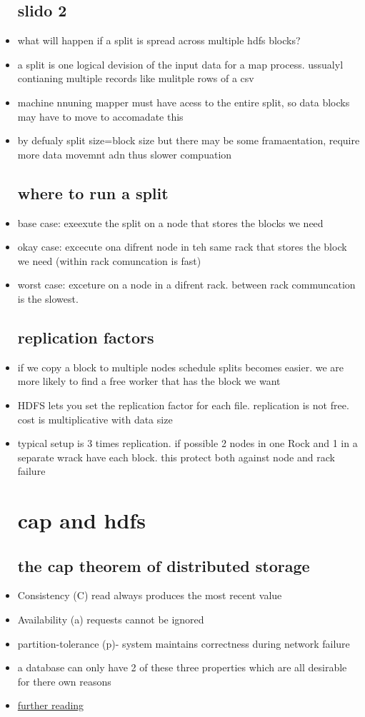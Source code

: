 \documentclass{article}
\begin{document}
\begin{itemize}
\subsection{slido 2}
\item what will happen if a split is spread across multiple hdfs blocks? 
\item a split is one logical devision of the input data for a map process. ussualyl contianing multiple records like mulitple rows of a csv
\item machine nnuning mapper must have acess to the entire split, so data blocks may have to move to accomadate this 
\item by defualy split size=block size but there may be some framaentation, require more data movemnt adn thus slower compuation 
\subsection{where to run a split}
\item base case: exeexute the split on a node that stores the blocks we need 
\item okay case: excecute ona  difrent node in teh same rack that stores the block we need (within  rack comuncation is fast)
\item worst case: exceture on a node in a difrent rack. between rack communcation is the slowest. 
\subsection{replication factors}
\item if we copy a block to multiple nodes schedule splits becomes easier. we are more likely to find a free worker that has the block we want 
\item HDFS lets you set the replication factor for each file. replication is not free. cost is multiplicative with data size
\item typical setup is 3 times replication. if possible 2 nodes in one Rock and 1 in a separate wrack have each block. this protect both against node and rack failure
\section{cap and hdfs}
\subsection{the cap theorem of distributed storage}
\item Consistency (C) read always produces the most recent value 
\item Availability (a) requests cannot be ignored
\item partition-tolerance (p)- system maintains correctness during network failure
\item a database can only have 2 of these three properties which are all desirable for there own reasons 
\item \href{https://www.ibm.com/topics/cap-theorem}{further reading}

\end{itemize}
\end{document}
